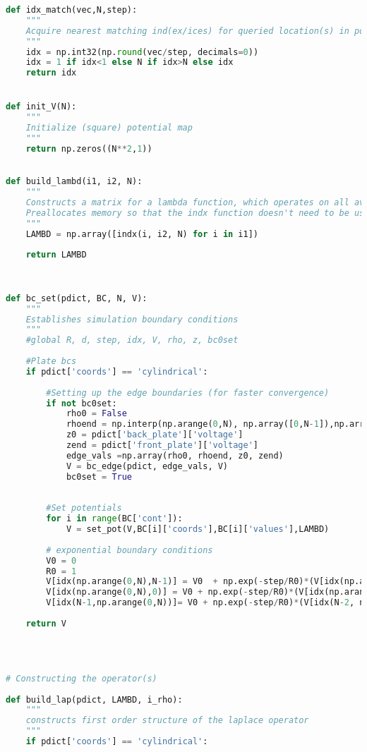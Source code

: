 \begin{lstlisting}[frame=single, language=Python]
def idx_match(vec,N,step):
    """
    Acquire nearest matching ind(ex/ices) for queried location(s) in potential map
    """
    idx = np.int32(np.round(vec/step, decimals=0))
    idx = 1 if idx<1 else N if idx>N else idx
    return idx


def init_V(N):
    """
    Initialize (square) potential map
    """
    return np.zeros((N**2,1))
    

def build_lambd(i1, i2, N):
    """
    Constructs a matrix for a lambda function, which operates on all available indices in the simulation.
    Preallocates memory so that the indx function doesn't need to be used twice (reducing computations).
    """
    LAMBD = np.array([indx(i, i2, N) for i in i1])
    
    return LAMBD
        
    

def bc_set(pdict, BC, N, V):
    """
    Establishes simulation boundary conditions
    """
    #global R, d, step, idx, V, rho, z, bc0set
    
    #Plate bcs
    if pdict['coords'] == 'cylindrical':
        
        #Setting up the edge boundaries (for faster convergence)  
        if not bc0set:
            rho0 = False
            rhoend = np.interp(np.arange(0,N), np.array([0,N-1]),np.array([pdict['back_plate']['voltage'],pdict['front_plate']['voltage']])).reshape(N,1)
            z0 = pdict['back_plate']['voltage']
            zend = pdict['front_plate']['voltage']
            edge_vals =np.array(rho0, rhoend, z0, zend)
            V = bc_edge(pdict, edge_vals, V)
            bc0set = True
            
            
        #Set potentials
        for i in range(BC['cont']):
            V = set_pot(V,BC[i]['coords'],BC[i]['values'],LAMBD)
        
        # exponential boundary conditions
        V0 = 0
        R0 = 1
        V[idx(np.arange(0,N),N-1)] = V0  + np.exp(-step/R0)*(V[idx(np.arange(0,N), N-2)]-V0)
        V[idx(np.arange(0,N),0)] = V0 + np.exp(-step/R0)*(V[idx(np.arange(0,N),1)]-V0)
        V[idx(N-1,np.arange(0,N))]= V0 + np.exp(-step/R0)*(V[idx(N-2, np.arange(0,N))]-V0) 
                 
    return V
                 

                 

# Constructing the operator(s)
    
def build_lap(pdict, LAMBD, i_rho):
    """
    constructs first order structure of the laplace operator
    """
    if pdict['coords'] == 'cylindrical':
        

\end{lstlisting}
